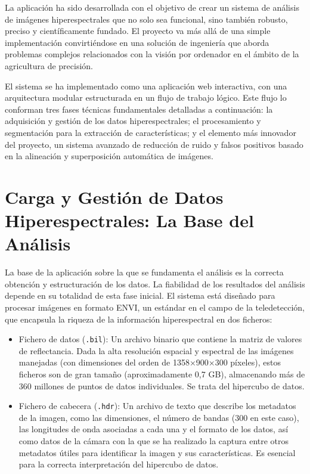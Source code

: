 
La aplicación ha sido desarrollada con el objetivo de crear un sistema de análisis de imágenes hiperespectrales que no solo sea funcional, sino también robusto, preciso y científicamente fundado. El proyecto va más allá de una simple implementación convirtiéndose en una solución de ingeniería que aborda problemas complejos relacionados con la visión por ordenador en el ámbito de la agricultura de precisión.

El sistema se ha implementado como una aplicación web interactiva, con una arquitectura modular estructurada en un flujo de trabajo lógico. Este flujo lo conforman tres fases técnicas fundamentales detalladas a continuación: la adquisición y gestión de los datos hiperespectrales; el procesamiento y segmentación para la extracción de características; y el elemento más innovador del proyecto, un sistema avanzado de reducción de ruido y falsos positivos basado en la alineación y superposición automática de imágenes.


\section{Carga y Gestión de Datos Hiperespectrales: La Base del Análisis}

La base de la aplicación sobre la que se fundamenta el análisis es la correcta obtención y estructuración de los datos. La fiabilidad de los resultados del análisis depende en su totalidad de esta fase inicial. El sistema está diseñado para procesar imágenes en formato ENVI, un estándar en el campo de la teledetección, que encapsula la riqueza de la información hiperespectral en dos ficheros:

\begin{itemize}
    \item Fichero de datos (\verb|.bil|): Un archivo binario que contiene la matriz de valores de reflectancia. Dada la alta resolución espacial y espectral de las imágenes manejadas (con dimensiones del orden de 1358×900×300 píxeles), estos ficheros son de gran tamaño (aproximadamente 0,7 GB), almacenando más de 360 millones de puntos de datos individuales.  Se trata del hipercubo de datos.

    \item Fichero de cabecera (\verb|.hdr|): Un archivo de texto que describe los metadatos de la imagen, como las dimensiones, el número de bandas (300 en este caso), las longitudes de onda asociadas a cada una y el formato de los datos, así como datos de la cámara con la que se ha realizado la captura entre otros metadatos útiles para identificar la imagen y sus características. Es esencial para la correcta interpretación del hipercubo de datos.

\end{itemize}

